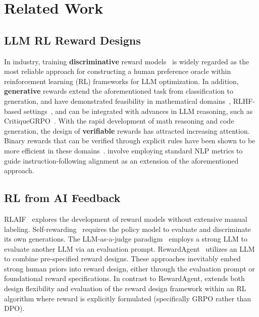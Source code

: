 \section{Related Work}


\subsection{LLM RL Reward Designs}


In industry, training \textbf{discriminative} reward models~\citep{ouyangrlhf, deepseekr1, skyworkreward} is widely regarded as the most reliable approach for constructing a human preference oracle within reinforcement learning (RL) frameworks for LLM optimization. In addition, \textbf{generative} rewards extend the aforementioned task from classification to generation, and have demonstrated feasibility in mathematical domains~\citep{generativerm}, RLHF-based settings~\citep{ke-etal-2024-critiquellm, wang2024pandalm, zhu2025judgelm, autoj}, and can be integrated with advances in LLM reasoning, such as CritiqueGRPO~\citep{critiqueGRPO}.
With the rapid development of math reasoning and code generation, the design of \textbf{verifiable} rewards has attracted increasing attention. Binary rewards that can be verified through explicit rules have been shown to be more efficient in these domains~\citep{grpo, tulu3}. \citet{bleuberi} involve employing standard NLP metrics to guide instruction-following alignment as an extension of the aforementioned approach.

\subsection{RL from AI Feedback}


RLAIF~\citep{lee2024rlaif} explores the development of reward models without extensive manual labeling. Self-rewarding~\citep{selfreward} requires the policy model to evaluate and discriminate its own generations. The LLM-as-a-judge paradigm~\citep{mtbench} employs a strong LLM to evaluate another LLM via an evaluation prompt. RewardAgent~\citep{rewardagent} utilizes an LLM to combine pre-specified reward designs. These approaches inevitably embed strong human priors into reward design, either through the evaluation prompt or foundational reward specifications. In contrast to RewardAgent, \method{} extends both design flexibility and evaluation of the reward design framework within an RL algorithm where reward is explicitly formulated (specifically GRPO rather than DPO).

